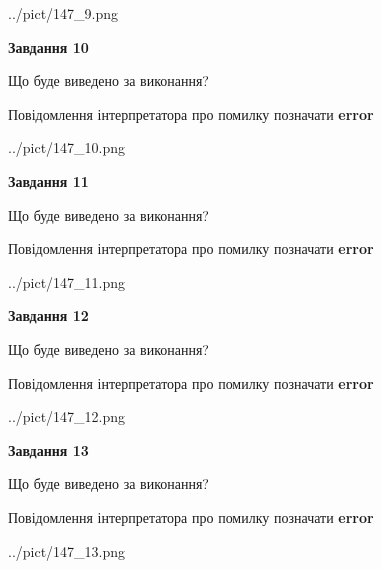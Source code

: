 \documentclass[11pt, ukrainian]{article}
\begin{document}
{\begin {large}
\begin{center}
	{../pict/147_9.png}
\end{center}
\newpage

{\begin {center}\textbf{Завдання 10}\end {center}}\par
Що буде виведено за виконання? \par
Повідомлення інтерпретатора про помилку позначати \textbf{error}

\begin{center}
	{../pict/147_10.png}
\end{center}
\newpage

{\begin {center}\textbf{Завдання 11}\end {center}}\par
Що буде виведено за виконання? \par
Повідомлення інтерпретатора про помилку позначати \textbf{error}

\begin{center}
	{../pict/147_11.png}
\end{center}
\newpage

{\begin {center}\textbf{Завдання 12}\end {center}}\par
Що буде виведено за виконання? \par
Повідомлення інтерпретатора про помилку позначати \textbf{error}

\begin{center}
	{../pict/147_12.png}
\end{center}
\newpage

{\begin {center}\textbf{Завдання 13}\end {center}}\par
Що буде виведено за виконання? \par
Повідомлення інтерпретатора про помилку позначати \textbf{error}

\begin{center}
	{../pict/147_13.png}
\end{center}
\newpage


\end{large}}
\end{document}
